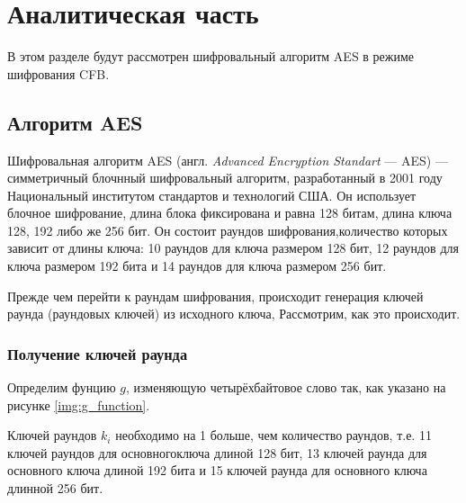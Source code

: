 \chapter{Аналитическая часть}

В этом разделе будут рассмотрен шифровальный алгоритм AES в режиме шифрования CFB.


\section{Алгоритм AES}

Шифровальная алгоритм AES (англ. \textit{Advanced Encryption Standart} --- AES) --- симметричный блочнный шифровальный алгоритм, разработанный в 2001 году Национальный институтом стандартов и технологий США. Он использует блочное шифрование, длина блока фиксирована и равна 128 битам, длина ключа 128, 192 либо же 256 бит. Он состоит раундов шифрования,количество которых зависит от длины ключа: 10 раундов для ключа размером 128 бит, 12 раундов для ключа размером 192 бита и 14 раундов для ключа размером 256 бит.

Прежде чем перейти к раундам шифрования, происходит генерация ключей раунда (раундовых ключей) из исходного ключа, Рассмотрим, как это происходит.

\subsection{Получение ключей раунда}

Определим фунцию $g$, изменяющую четырёхбайтовое слово так, как указано на рисунке \ref{img:g_function}.

Ключей раундов $k_{i}$ необходимо на 1 больше, чем количество раундов, т.е. 11 ключей раундов для основногоключа длиной 128 бит, 13 ключей раунда для основного ключа длиной 192 бита и 15 ключей раунда для основного ключа длинной 256 бит.

\clearpage

